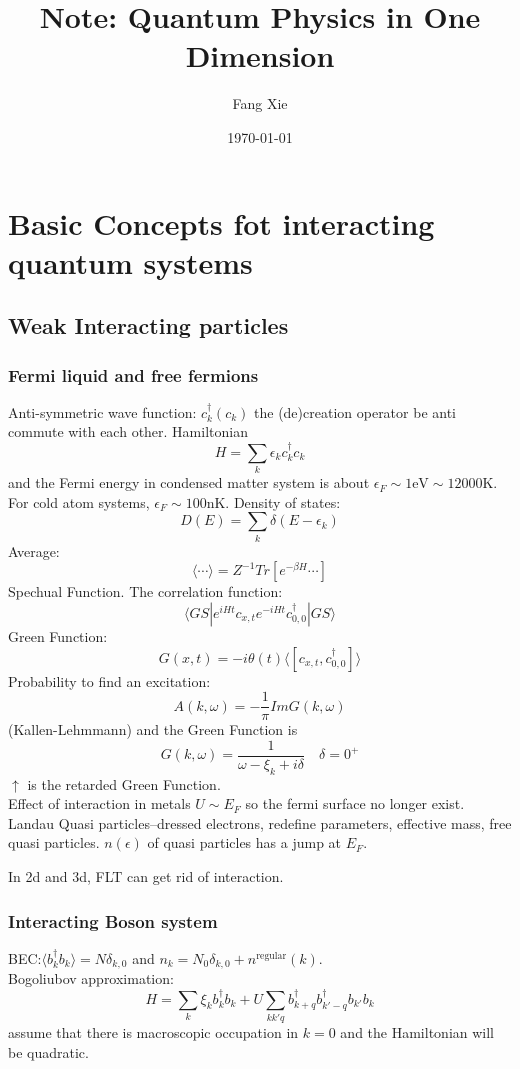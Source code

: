 \documentclass{article}
\title{Note: Quantum Physics in One Dimension}
\author{Fang Xie}
\date{\today}
\begin{document}
\maketitle
\section{Basic Concepts fot interacting quantum systems}
\subsection{Weak Interacting particles}
\subsubsection{Fermi liquid and free fermions}
Anti-symmetric wave function: $c^\dagger_k(c_k)$ the (de)creation operator be anti commute with each other. Hamiltonian
$$
H = \sum_k \epsilon_k c^\dagger_kc_k
$$
and the Fermi energy in condensed matter system is about $\epsilon_F \sim 1\mathrm{eV}\sim 12000\mathrm{K}$. For cold atom systems, $\epsilon_F \sim 100\mathrm{nK}$. 
Density of states:
$$
D(E) = \sum_k \delta(E-\epsilon_k)
$$
Average:
$$
\langle \cdots \rangle = Z^{-1}Tr\left[e^{-\beta H}\cdots\right]
$$
Spechual Function. The correlation function:
$$
\langle GS | e^{iHt}c_{x,t}e^{-iHt}c^\dagger_{0,0}|GS\rangle
$$
Green Function:
$$
G(x,t)=-i\theta(t)\langle [c_{x,t},c^\dagger_{0,0}]\rangle
$$
Probability to find an excitation:
$$
A(k,\omega) = -\frac{1}{\pi}Im{G(k,\omega)}
$$
(Kallen-Lehmmann)
and the Green Function is
$$
G(k,\omega) = \frac{1}{\omega-\xi_k+i\delta}\quad \delta = 0^+
$$
$\uparrow$ is the retarded Green Function.\\
Effect of interaction in metals $U\sim E_F$ so the fermi surface no longer exist.
Landau Quasi particles--dressed electrons, redefine parameters, effective mass, free quasi particles. $n(\epsilon)$ of quasi particles has a jump at $E_F$.

In 2d and 3d, FLT can get rid of interaction.

\subsubsection{Interacting Boson system}
BEC:$\langle b^\dagger_k b_k\rangle = N \delta_{k,0}$ and $n_{k} = N_0\delta_{k,0}+ n^{\mathrm{regular}}(k)$.\\Bogoliubov approximation:
$$
H = \sum_k \xi_k b^\dagger_k b_k + U\sum_{kk'q}b^\dagger_{k+q}b^\dagger_{k'-q}b_{k'}b_{k}
$$
assume that there is macroscopic occupation in $k = 0$ and the Hamiltonian will be quadratic.
\end{document}
